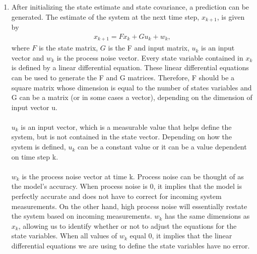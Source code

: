 \begin{enumerate}
   
  \item After initializing the state estimate and state covariance, a prediction can be generated. The estimate of the system at the next time step, $x_{k+1}$,  is given by
  \begin{align*}
      x_{k+1} = F x_{k} +  G u_{k} + w_{k} ,
  \end{align*} 
  where $F$ is the state matrix, $G$ is the F and input matrix, $u_k$ is an input vector and $w_k$ is the process noise vector. Every state variable contained in $x_k$ is defined by a linear differential equation. These linear differential equations can be used to generate the F and G matrices. Therefore, F should be a square matrix whose dimension is equal to the number of states variables and G can be a matrix (or in some cases a vector), depending on the dimension of input vector u. \\ \\
  $u_k$  is an input vector, which is a measurable value that helps define the system, but is not contained in the state vector. Depending on how the system is defined, $u_k$  can be a constant value or it can be a value dependent on time step k. \\ \\
  $w_k$ is the process noise vector at time k. Process noise can be thought of as the model's accuracy. When process noise is 0, it implies that the model is perfectly accurate and does not have to correct for incoming system measurements. On the other hand, high process noise will essentially restate the system based on incoming measurements. $w_k$ has the same dimensions as $x_k$, allowing us to identify whether or not to adjust the equations for the state variables. When all values of  $w_k$ equal 0, it implies that the linear differential equations we are using to define the state variables have no error. 
  
  
  

\end{enumerate}
